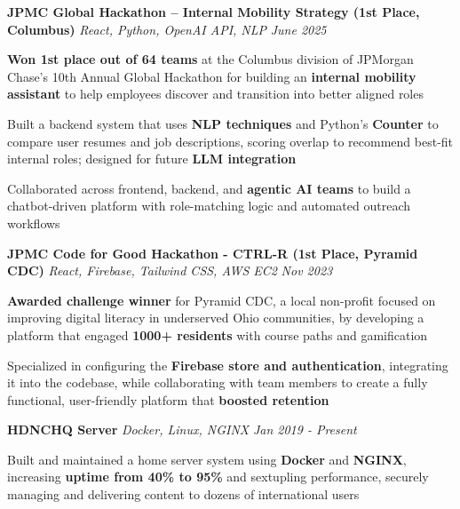 \documentclass[letterpaper]{article}
\begin{document}

    {\textbf{JPMC Global Hackathon – Internal Mobility Strategy (1st Place, Columbus)}} {\sl React, Python, OpenAI API, NLP} \hfill \textsl{June 2025} \\
    \vspace{-2mm}
    \begin{tightitemize} \itemsep -1mm
        \item \textbf{Won 1st place out of 64 teams} at the Columbus division of JPMorgan Chase's 10th Annual Global Hackathon for building an \textbf{internal mobility assistant} to help employees discover and transition into better aligned roles
        \item Built a backend system that uses \textbf{NLP techniques} and Python's \textbf{Counter} to compare user resumes and job descriptions, scoring overlap to recommend best-fit internal roles; designed for future \textbf{LLM integration}
        \item Collaborated across frontend, backend, and \textbf{agentic AI teams} to build a chatbot-driven platform with role-matching logic and automated outreach workflows
    \end{tightitemize}

    \vspace{-2mm}
    {\textbf{JPMC Code for Good Hackathon - CTRL-R (1st Place, Pyramid CDC)}} {\sl React, Firebase, Tailwind CSS, AWS EC2} \hfill \textsl{Nov 2023}\\
    \vspace{-2mm}
    \begin{tightitemize} \itemsep -1mm
    
        \item \textbf{Awarded challenge winner} for Pyramid CDC, a local non-profit focused on improving digital literacy in underserved Ohio communities, by developing a platform that engaged \textbf{1000+ residents} with course paths and gamification

        \item Specialized in configuring the \textbf{Firebase store and authentication}, integrating it into the codebase, while collaborating with team members to create a fully functional, user-friendly platform that \textbf{boosted retention}

    \end{tightitemize}
    \vspace{-2mm}

    {\textbf{HDNCHQ Server}} {\sl Docker, Linux, NGINX} \hfill \textsl{Jan 2019 - Present}\\
    \vspace{-2mm}
    \begin{tightitemize} \itemsep -1mm

        \item Built and maintained a home server system using \textbf{Docker} and \textbf{NGINX}, increasing \textbf{uptime from 40\% to 95\%} and sextupling performance, securely managing and delivering content to dozens of international users
                
    \end{tightitemize}
    \vspace{-2mm}
\end{document}
